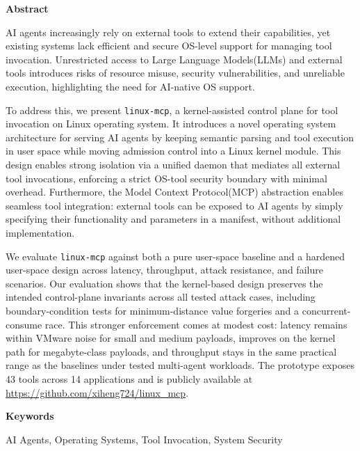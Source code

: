 \onehalfspacing
{} %
{\fontsize{16pt}{30pt}\selectfont \noindent\textbf{Abstract}}
\vspace{0.5cm}
{\fontsize{12pt}{18pt}\selectfont

AI agents increasingly rely on external tools to extend their capabilities, yet existing systems lack efficient and secure OS-level support for managing tool invocation. 
Unrestricted access to Large Language Models(LLMs) and external tools introduces risks of resource misuse, security vulnerabilities, and unreliable execution, highlighting the need for AI-native OS support.

To address this, we present \texttt{linux-mcp}, a kernel-assisted control plane for tool invocation on Linux operating system.
It introduces a novel operating system architecture for serving AI agents by keeping semantic parsing and tool execution in user space while moving admission control into a Linux kernel module.
This design enables strong isolation via a unified daemon that mediates all external tool invocations, enforcing a strict OS-tool security boundary with minimal overhead.
Furthermore, the Model Context Protocol(MCP) abstraction enables seamless tool integration: external tools can be exposed to AI agents by simply specifying their functionality and parameters in a manifest, without additional implementation.

We evaluate \texttt{linux-mcp} against both a pure user-space baseline and a hardened user-space design across latency, throughput, attack resistance, and failure scenarios. 
Our evaluation shows that the kernel-based design preserves the intended control-plane invariants across all tested attack cases, including boundary-condition tests for minimum-distance value forgeries and a concurrent-consume race. 
This stronger enforcement comes at modest cost: latency remains within VMware noise for small and medium payloads, improves on the kernel path for megabyte-class payloads, and throughput stays in the same practical range as the baselines under tested multi-agent workloads.
The prototype exposes 43 tools across 14 applications and is publicly available at \url{https://github.com/xiheng724/linux_mcp}.

}
\vspace{0.5cm}
{\fontsize{16pt}{30pt}\selectfont \noindent\textbf{Keywords}}
\vspace{0.5cm}
{\fontsize{12pt}{18pt}\selectfont

AI Agents, Operating Systems, Tool Invocation, System Security

}


